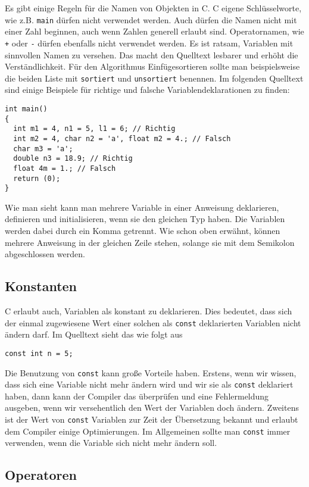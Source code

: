 Es gibt einige Regeln für die Namen von Objekten in C. 
C eigene Schlüsselworte, wie z.B. \texttt{main} dürfen nicht verwendet werden.
Auch dürfen die Namen nicht mit einer Zahl beginnen, auch wenn Zahlen generell erlaubt sind.
Operatornamen, wie \verb|+| oder \verb|-| dürfen ebenfalls nicht verwendet werden.
Es ist ratsam, Variablen mit sinnvollen Namen zu versehen.
Das macht den Quelltext lesbarer und erhöht die Verständlichkeit.
Für den Algorithmus Einfügesortieren sollte man beispielsweise die beiden Liste mit \texttt{sortiert} und \texttt{unsortiert} benennen.
Im folgenden Quelltext sind einige Beispiele für richtige und falsche Variablendeklarationen zu finden:
\begin{lstlisting}
int main()
{
  int m1 = 4, n1 = 5, l1 = 6; // Richtig
  int m2 = 4, char n2 = 'a', float m2 = 4.; // Falsch
  char m3 = 'a';
  double n3 = 18.9; // Richtig
  float 4m = 1.; // Falsch
  return (0);
}
\end{lstlisting} 
Wie man sieht kann man mehrere Variable in einer Anweisung deklarieren, definieren und initialisieren, wenn sie den gleichen Typ haben.
Die Variablen werden dabei durch ein Komma getrennt.
Wie schon oben erwähnt, können mehrere Anweisung in der gleichen Zeile stehen, solange sie mit dem Semikolon abgeschlossen werden.

\subsection{Konstanten}

C erlaubt auch, Variablen als konstant zu deklarieren. 
Dies bedeutet, dass sich der einmal zugewiesene Wert einer solchen als \verb|const| deklarierten Variablen nicht ändern darf.
Im Quelltext sieht das wie folgt aus
\begin{lstlisting}
const int n = 5;
\end{lstlisting}
Die Benutzung von \verb|const| kann große Vorteile haben.
Erstens, wenn wir wissen, dass sich eine Variable nicht mehr ändern wird und wir sie als  \verb|const| deklariert haben, dann kann der Compiler das überprüfen und eine Fehlermeldung ausgeben, wenn wir versehentlich den Wert der Variablen doch ändern.
Zweitens ist der Wert von \verb|const| Variablen zur Zeit der Übersetzung bekannt und erlaubt dem Compiler einige Optimierungen.
Im Allgemeinen sollte man \verb|const| immer verwenden, wenn die Variable sich nicht mehr ändern soll.

\subsection{Operatoren}

